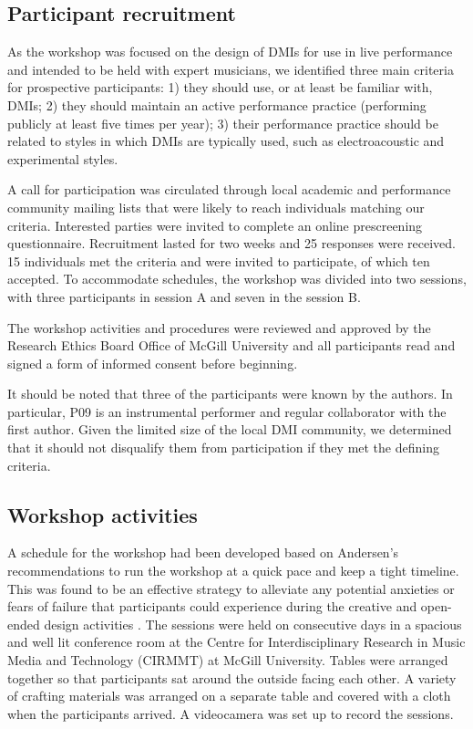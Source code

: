 \documentclass[letterpaper, 12pt]{article}
\begin{document}
\subsection{Participant recruitment}
\label{sec:participant-criteria-and-selection}

As the workshop was focused on the design of DMIs for use in live performance and intended to be held with expert musicians, we identified three main criteria for prospective participants: 1) they should use, or at least be familiar with, DMIs; 2) they should maintain an active performance practice (performing publicly at least five times per year); 3) their performance practice should be related to styles in which DMIs are typically used, such as electroacoustic and experimental styles.

A call for participation was circulated through local academic and performance community mailing lists that were likely to reach individuals matching our criteria. Interested parties were invited to complete an online prescreening questionnaire. Recruitment lasted for two weeks and 25 responses were received. 15 individuals met the criteria and were invited to participate, of which ten accepted. To accommodate schedules, the workshop was divided into two sessions, with three participants in session A and seven in the session B. 

The workshop activities and procedures were reviewed and approved by the Research Ethics Board Office of 
McGill University
and all participants read and signed a form of informed consent before beginning. 

It should be noted that three of the participants were known by the authors. In particular, P09 is an instrumental performer and regular collaborator with the first author. Given the limited size of the local DMI community, we determined that it should not disqualify them from participation if they met the defining criteria.

\subsection{Workshop activities}
\label{sec:workshop-activities}

A schedule for the workshop had been developed based on Andersen's recommendations to run the workshop at a quick pace and keep a tight timeline. This was found to be an effective strategy to alleviate any potential anxieties or fears of failure that participants could experience during the creative and open-ended design activities \citep{Andersen2017}. The sessions were held on consecutive days in a spacious and well lit conference room at 
the Centre for Interdisciplinary Research in Music Media and Technology (CIRMMT) at McGill University. 
Tables were arranged together so that participants sat around the outside facing each other. A variety of crafting materials was arranged on a separate table and covered with a cloth when the participants arrived. A videocamera was set up to record the sessions.
\end{document}
